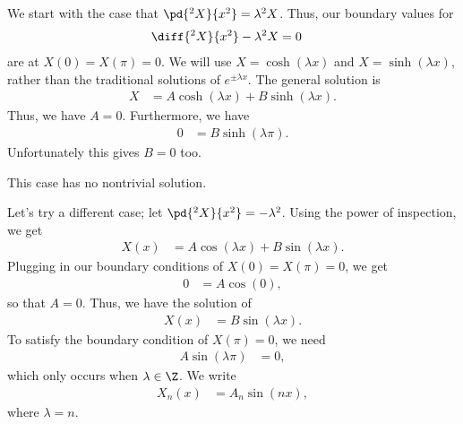 \documentclass[10pt]{mypackage}
\begin{document}
\begin{example}
  We start with the case that $ \pd{^2X}{x^2} = \lambda^2 X $. Thus, our boundary values for 
  \begin{align*}
    \diff{^2X}{x^2} - \lambda^2 X &= 0
  \end{align*}
  are at $X(0) = X(\pi) = 0$. We will use $X = \cosh\left( \lambda x \right)$ and $X = \sinh\left( \lambda x \right)$, rather than the traditional solutions of $e^{\pm \lambda x}$. The general solution is
  \begin{align*}
    X &= A\cosh\left( \lambda x \right) + B\sinh\left( \lambda x \right).
  \end{align*}
  Thus, we have $A = 0$. Furthermore, we have
  \begin{align*}
    0 &= B\sinh\left( \lambda \pi \right).
  \end{align*}
  Unfortunately this gives $B = 0$ too.\newline

  This case has no nontrivial solution.\newline

  Let's try a different case; let $ \pd{^2 X}{x^2} = -\lambda^2 $. Using the power of inspection, we get
  \begin{align*}
    X(x) &= A\cos\left( \lambda x \right) + B\sin\left( \lambda x \right).
  \end{align*}
  Plugging in our boundary conditions of $X(0) = X(\pi) = 0$, we get
  \begin{align*}
    0 &= A\cos\left( 0 \right),
  \end{align*}
  so that $A = 0$. Thus, we have the solution of
  \begin{align*}
    X(x) &= B\sin\left( \lambda x \right).
  \end{align*}
  To satisfy the boundary condition of $X(\pi) = 0$, we need
  \begin{align*}
    A \sin\left( \lambda \pi \right) &= 0,
  \end{align*}
  which only occurs when $\lambda\in \Z$. We write
  \begin{align*}
    X_n(x) &= A_{n}\sin\left( n x \right),
  \end{align*}
  where $\lambda = n$.\newline


\end{example}
\end{document}
